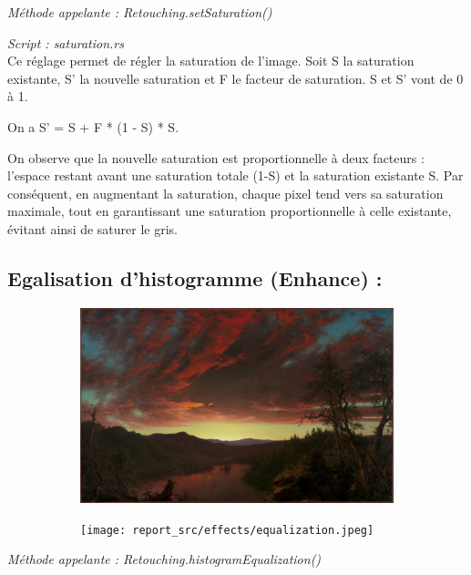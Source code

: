 \emph{Méthode appelante : Retouching.setSaturation()}

\emph{Script : saturation.rs}
\\

Ce réglage permet de régler la saturation de l'image. Soit S la saturation existante, S' la nouvelle saturation et F le facteur de saturation. S et S' vont de 0 à 1.

On a S' = S + F * (1 - S) * S. 

On observe que la nouvelle saturation est proportionnelle à deux facteurs : l'espace restant avant une saturation totale (1-S) et la saturation existante S.
Par conséquent, en augmentant la saturation, chaque pixel tend vers sa saturation maximale, tout en garantissant une saturation proportionnelle à celle existante, évitant ainsi de saturer le gris.


\subsection{Egalisation d'histogramme (Enhance) :}

\begin{figure}[!h]
    \centering
    \begin{subfigure}[b]{0.3\textwidth}
        \includegraphics[width=1\textwidth]{report_src/effects/original1.jpeg}
    \end{subfigure}
    \begin{subfigure}[b]{0.3\textwidth}
        \texttt{[image: report\_src/effects/equalization.jpeg]}
    \end{subfigure}
\end{figure} 

\emph{Méthode appelante : Retouching.histogramEqualization()}

